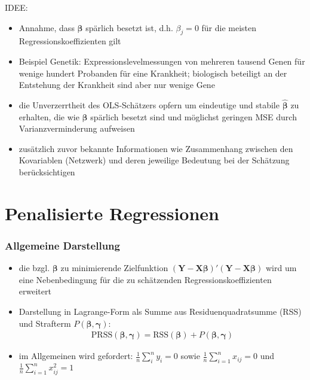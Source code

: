 \documentclass{beamer}
\begin{document}
\begin{frame}
	IDEE:
	\begin{itemize}
	\pause \item Annahme, dass $\boldsymbol{\beta}$ spärlich besetzt ist, d.h. $\beta_j=0$ für die meisten Regressionskoeffizienten gilt
	\pause \item Beispiel Genetik: Expressionslevelmessungen von mehreren tausend Genen für wenige hundert Probanden für eine Krankheit; biologisch beteiligt an der Entstehung der Krankheit sind aber nur wenige Gene
	\pause \item die Unverzerrtheit des OLS-Schätzers {\glqq}opfern{\grqq} um eindeutige und stabile $\boldsymbol{\hat{\beta}}$ zu erhalten, die wie $\boldsymbol{\beta}$ spärlich besetzt sind und möglichst geringen MSE durch Varianzverminderung aufweisen
	\pause \item zusätzlich zuvor bekannte Informationen wie Zusammenhang zwischen den Kovariablen (Netzwerk) und deren jeweilige Bedeutung bei der Schätzung berücksichtigen
	\end{itemize}
\end{frame}


\section{Penalisierte Regressionen}
\begin{frame} %
\frametitle{Allgemeine Darstellung}
  \begin{itemize}
  \item die bzgl. $\boldsymbol{\beta}$ zu minimierende Zielfunktion $(\mathbf{Y}-\mathbf{X}\boldsymbol{\beta})'(\mathbf{Y}-\mathbf{X}\boldsymbol{\beta})$ wird um eine Nebenbedingung für die zu schätzenden Regressionskoeffizienten erweitert 
  \item Darstellung in Lagrange-Form als Summe aus Residuenquadratsumme (RSS) und Strafterm $P(\boldsymbol{\beta}, \boldsymbol{\gamma})$:
  \begin{align*}
  \text{PRSS}(\boldsymbol{\beta}, \boldsymbol{\gamma})=\text{RSS}(\boldsymbol{\beta})+P(\boldsymbol{\beta}, \boldsymbol{\gamma})
  \end{align*}
  \item im Allgemeinen wird gefordert: $\frac{1}{n}\sum_{i}^{n}y_i =0$ sowie $\frac{1}{n}\sum_{i=1}^{n}x_{ij}=0$ und $\frac{1}{n}\sum_{i=1}^{n}x_{ij}^2=1$
  \end{itemize} 
\end{frame}
\end{document}
